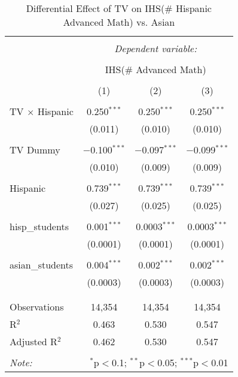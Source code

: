 
\begin{table}[!htbp] \centering 
  \caption{Differential Effect of TV on IHS(\# Hispanic Advanced Math) vs. Asian} 
  \label{} 
\begin{tabular}{@{\extracolsep{-2pt}}lccc} 
\\[-1.8ex]\hline 
\hline \\[-1.8ex] 
 & \multicolumn{3}{c}{\textit{Dependent variable:}} \\ 
\cline{2-4} 
\\[-1.8ex] & \multicolumn{3}{c}{IHS(\# Advanced Math)} \\ 
\\[-1.8ex] & (1) & (2) & (3)\\ 
\hline \\[-1.8ex] 
 TV $\times$ Hispanic & 0.250$^{***}$ & 0.250$^{***}$ & 0.250$^{***}$ \\ 
  & (0.011) & (0.010) & (0.010) \\ 
  & & & \\ 
 TV Dummy & $-$0.100$^{***}$ & $-$0.097$^{***}$ & $-$0.099$^{***}$ \\ 
  & (0.010) & (0.009) & (0.009) \\ 
  & & & \\ 
 Hispanic & 0.739$^{***}$ & 0.739$^{***}$ & 0.739$^{***}$ \\ 
  & (0.027) & (0.025) & (0.025) \\ 
  & & & \\ 
 hisp\_students & 0.001$^{***}$ & 0.0003$^{***}$ & 0.0003$^{***}$ \\ 
  & (0.0001) & (0.0001) & (0.0001) \\ 
  & & & \\ 
 asian\_students & 0.004$^{***}$ & 0.002$^{***}$ & 0.002$^{***}$ \\ 
  & (0.0003) & (0.0003) & (0.0003) \\ 
  & & & \\ 
\hline \\[-1.8ex] 
Observations & 14,354 & 14,354 & 14,354 \\ 
R$^{2}$ & 0.463 & 0.530 & 0.547 \\ 
Adjusted R$^{2}$ & 0.462 & 0.530 & 0.547 \\ 
\hline 
\hline \\[-1.8ex] 
\textit{Note:}  & \multicolumn{3}{r}{$^{*}$p$<$0.1; $^{**}$p$<$0.05; $^{***}$p$<$0.01} \\ 
\end{tabular} 
\end{table} 
